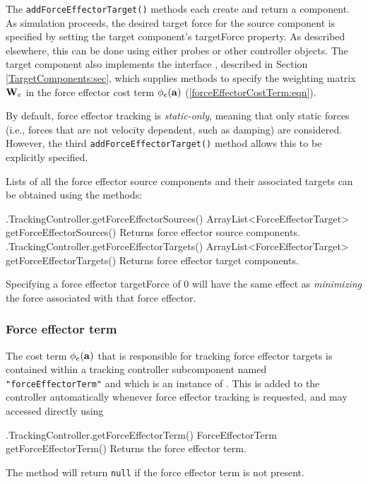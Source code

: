 The {\tt addForceEffectorTarget()} methods each create and return a
 component. 
As simulation proceeds, the desired target force for the source component is
specified by setting the target component's {\sf targetForce} property.  As
described elsewhere, this can be done using either probes or other controller
objects.  The target component also implements the interface
, described in
Section \ref{TargetComponents:sec}, which supplies methods to specify the
weighting matrix ${\bf W}_e$ in the force effector cost term $\phi_e({\bf a})$
(\ref{forceEffectorCostTerm:eqn}).

By default, force effector tracking is {\it static-only}, meaning that only
static forces (i.e., forces that are not velocity dependent, such as damping)
are considered.  However, the third {\tt addForceEffectorTarget()} method
allows this to be explicitly specified.


Lists of all the force effector source components and their associated targets
can be obtained using the methods:
%
\begin{methodtable}{0.6}{0.4}
\midline
%
\methodentry
{\inverse.TrackingController.getForceEffectorSources()}%
{ArrayList<ForceEffectorTarget> getForceEffectorSources()}%
{Returns force effector source components.}%
%
\methodentry
{\inverse.TrackingController.getForceEffectorTargets()}%
{ArrayList<ForceEffectorTarget> getForceEffectorTargets()}%
{Returns force effector target components.}%
%
\midline
\end{methodtable}
%

\begin{sideblock}
Specifying a force effector {\sf targetForce} of 0 will have the
same effect as {\it minimizing} the force associated with that force effector.
\end{sideblock}

\subsubsection{Force effector term}
\label{ForceEffectorTerm:sec}

The cost term $\phi_e({\bf a})$ that is responsible for tracking force effector
targets is contained within a tracking controller subcomponent named
{\tt "forceEffectorTerm"} and which is an instance of
. 
This is added to the controller automatically whenever force effector tracking
is requested, and may accessed directly using
%
\begin{methodtable}{0.6}{0.4}
\midline
%
\methodentry
{\inverse.TrackingController.getForceEffectorTerm()}%
{ForceEffectorTerm getForceEffectorTerm()}%
{Returns the force effector term.}%
%
\midline
\end{methodtable}
%
The method will return {\tt null} if the force effector term is not present.

